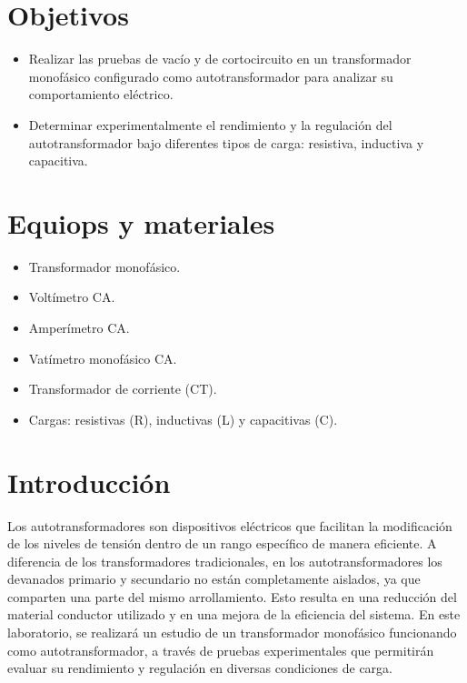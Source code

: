 \section{Objetivos} 
\begin{itemize}
    \item Realizar las pruebas de vacío y de cortocircuito en un transformador monofásico configurado como autotransformador para analizar su comportamiento eléctrico.
    \item Determinar experimentalmente el rendimiento y la regulación del autotransformador bajo diferentes tipos de carga: resistiva, inductiva y capacitiva.
\end{itemize}

\section{Equiops y materiales}
\begin{itemize}
    \item Transformador monofásico.
    \item Voltímetro CA.
    \item Amperímetro CA.
    \item Vatímetro monofásico CA.
    \item Transformador de corriente (CT).
    \item Cargas: resistivas (R), inductivas (L) y capacitivas (C).
\end{itemize}

\section{Introducción}
Los autotransformadores son dispositivos eléctricos que facilitan la modificación de los niveles de tensión dentro de un rango específico de manera eficiente. A diferencia de los transformadores tradicionales, en los autotransformadores los devanados primario y secundario no están completamente aislados, ya que comparten una parte del mismo arrollamiento. Esto resulta en una reducción del material conductor utilizado y en una mejora de la eficiencia del sistema. En este laboratorio, se realizará un estudio de un transformador monofásico funcionando como autotransformador, a través de pruebas experimentales que permitirán evaluar su rendimiento y regulación en diversas condiciones de carga.

